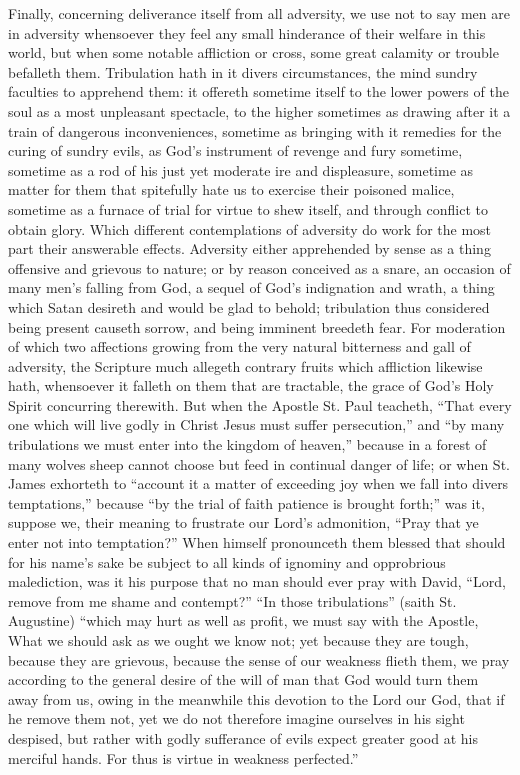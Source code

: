 Finally, concerning deliverance itself from all adversity, we use not to say men are in adversity whensoever they feel any small hinderance of their welfare in this world, but when some notable affliction or cross, some great calamity or trouble befalleth them. Tribulation hath in it divers circumstances, the mind sundry faculties to apprehend them: it offereth sometime itself to the lower powers of the soul as a most unpleasant spectacle, to the higher sometimes as drawing after it a train of dangerous inconveniences, sometime as bringing with it remedies for the curing of sundry evils, as God’s instrument of revenge and fury sometime, sometime as a rod of his just yet moderate ire and displeasure, sometime as matter for them that spitefully hate us to exercise their poisoned malice, sometime as a furnace of trial for virtue to shew itself, and through conflict to obtain glory. Which different contemplations of adversity do work  for the most part their answerable effects. Adversity either apprehended by sense as a thing offensive and grievous to nature; or by reason conceived as a snare, an occasion of many men’s falling from God, a sequel of God’s indignation and wrath, a thing which Satan desireth and would be glad to behold; tribulation thus considered being present causeth sorrow, and being imminent breedeth fear. For moderation of which two affections growing from the very natural bitterness and gall of adversity, the Scripture much allegeth contrary fruits which affliction likewise hath, whensoever it falleth on them that are tractable, the grace of God’s Holy Spirit concurring therewith.
But when the Apostle St. Paul teacheth, “That every one which will live godly in Christ Jesus must suffer persecution,” and “by many tribulations we must enter into the kingdom of heaven,” because in a forest of many wolves sheep cannot choose but feed in continual danger of life; or when St. James exhorteth to “account it a matter of exceeding joy when we fall into divers temptations,” because “by the trial of faith patience is brought forth;” was it, suppose we, their meaning to frustrate our Lord’s admonition, “Pray that ye enter not into temptation?” When himself pronounceth them blessed that should for his name’s sake be subject to all kinds of ignominy and opprobrious malediction, was it his purpose that no man should ever pray with David, “Lord, remove from me shame and contempt?”
“In those tribulations” (saith St. Augustine) “which may hurt as well as profit, we must say with the Apostle, What we should ask as we ought we know not; yet because they are tough, because they are grievous, because the sense of our weakness flieth them, we pray according to the  general desire of the will of man that God would turn them away from us, owing in the meanwhile this devotion to the Lord our God, that if he remove them not, yet we do not therefore imagine ourselves in his sight despised, but rather with godly sufferance of evils expect greater good at his merciful hands. For thus is virtue in weakness perfected.”
